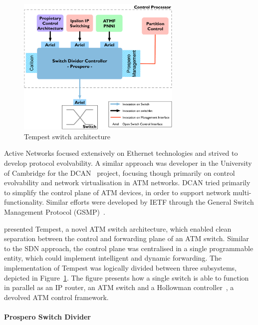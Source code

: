 \begin{figure}
  \begin{center}
\includegraphics[width=0.7\textwidth]{Background/BackgroundFigs/tempest_arch}
\caption{Tempest switch architecture~}
\label{fig:background:tempest_arch}
\end{center}
\end{figure}

Active Networks focused extensively on Ethernet technologies and strived to
develop protocol evolvability. A similar approach was developer in the
University of Cambridge for the DCAN~ project, focusing though
primarily on control evolvability and network virtualisation in ATM networks.
DCAN tried primarily to simplify the control plane of ATM devices, in order to
support network multi-functionality. Similar efforts were developed by IETF
through the General Switch Management Protocol (GSMP)~.

 presented Tempest, a novel ATM switch architecture, which
enabled clean separation between the control and forwarding plane of an ATM
switch. Similar to the SDN approach,  the control plane was centralised in a
single programmable entity, which could implement intelligent and dynamic
forwarding.  The implementation of Tempest was logically divided between three
subsystems, depicted in Figure~\ref{fig:background:tempest_arch}. The figure
presents how a single switch is able to function in parallel as an IP router, an
ATM switch and a Hollowman controller~, a devolved ATM
control framework. 

\paragraph{Prospero Switch Divider} 

